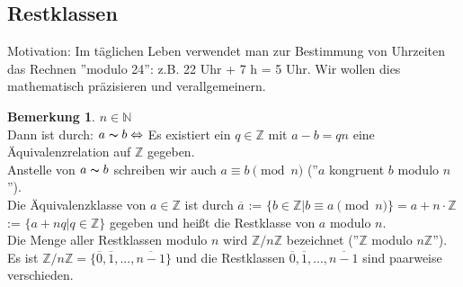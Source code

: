 \documentclass[10pt,a4paper,numbers=endperiod]{scrartcl}
\theoremstyle{definition}
\newtheorem{bem}[satz]{Bemerkung}
\begin{document}
\newpage

\subsection{Restklassen}

Motivation: Im täglichen Leben verwendet man zur Bestimmung von Uhrzeiten das Rechnen ''modulo 24'': z.B. 22 Uhr + 7 h = 5 Uhr. Wir wollen dies mathematisch präzisieren und verallgemeinern.

\begin{bem}
	$n \in \mathbb{N}$\\
	Dann ist durch: $a \thicksim b \Leftrightarrow$ Es existiert ein $q \in \mathbb{Z}$ mit $a-b = qn$ eine Äquivalenzrelation auf $\mathbb{Z}$ gegeben.\\
	Anstelle von $a \thicksim b$ schreiben wir auch $a \equiv b \pmod n$ (''$a$ kongruent $b$ modulo $n$'').\\
	Die Äquivalenzklasse von $a \in \mathbb{Z}$ ist durch $\overline{a}$ := $\{b\in \mathbb{Z}| b \equiv a \pmod n\} = a + n \cdot \mathbb{Z}$ := $ \{a +nq|q \in \mathbb{Z}\}$ gegeben und heißt die Restklasse von $a$ modulo $n$.\\
	Die Menge aller Restklassen modulo $n$ wird $\mathbb{Z}/n\mathbb{Z}$ bezeichnet (''$\mathbb{Z}$ modulo $n\mathbb{Z}$''). \\
	Es ist $\mathbb{Z}/n\mathbb{Z} = \{\overline{0},\overline{1},...,\overline{n-1}\}$ und die Restklassen $\overline{0}, \overline{1},...,\overline{n-1}$ sind paarweise verschieden.
\end{bem}
\end{document}
